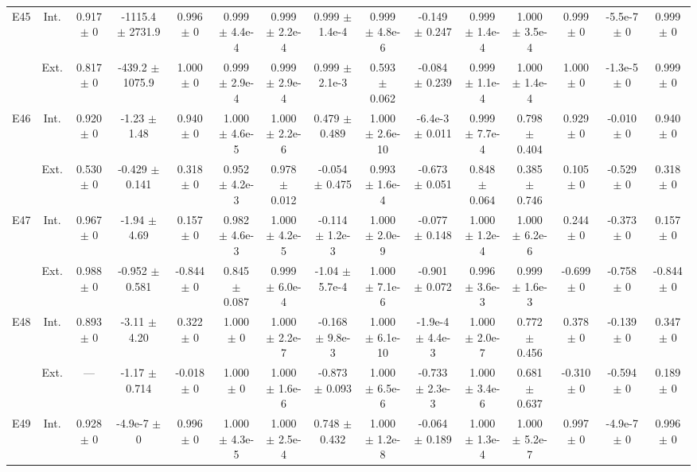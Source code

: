\begin{table}[htbp]
{\begin{tabular}{@{}ccccccccccccccc@{}}
\cline{2-15}
\multirow{2}{*}{E45} & Int. & 0.917 $\pm$ 0 & -1115.4 $\pm$ 2731.9 & 0.996 $\pm$ 0 & 0.999 $\pm$ 4.4e-4 & 0.999 $\pm$ 2.2e-4 & 0.999 $\pm$ 1.4e-4 & 0.999 $\pm$ 4.8e-6 & -0.149 $\pm$ 0.247 & 0.999 $\pm$ 1.4e-4 & 1.000 $\pm$ 3.5e-4 & 0.999 $\pm$ 0 & -5.5e-7 $\pm$ 0 & 0.999 $\pm$ 0 \\
 & Ext. & 0.817 $\pm$ 0 & -439.2 $\pm$ 1075.9 & 1.000 $\pm$ 0 & 0.999 $\pm$ 2.9e-4 & 0.999 $\pm$ 2.9e-4 & 0.999 $\pm$ 2.1e-3 & 0.593 $\pm$ 0.062 & -0.084 $\pm$ 0.239 & 0.999 $\pm$ 1.1e-4 & 1.000 $\pm$ 1.4e-4 & 1.000 $\pm$ 0 & -1.3e-5 $\pm$ 0 & 0.999 $\pm$ 0 \\
\cline{2-15}
\multirow{2}{*}{E46} & Int. & 0.920 $\pm$ 0 & -1.23 $\pm$ 1.48 & 0.940 $\pm$ 0 & 1.000 $\pm$ 4.6e-5 & 1.000 $\pm$ 2.2e-6 & 0.479 $\pm$ 0.489 & 1.000 $\pm$ 2.6e-10 & -6.4e-3 $\pm$ 0.011 & 0.999 $\pm$ 7.7e-4 & 0.798 $\pm$ 0.404 & 0.929 $\pm$ 0 & -0.010 $\pm$ 0 & 0.940 $\pm$ 0 \\
 & Ext. & 0.530 $\pm$ 0 & -0.429 $\pm$ 0.141 & 0.318 $\pm$ 0 & 0.952 $\pm$ 4.2e-3 & 0.978 $\pm$ 0.012 & -0.054 $\pm$ 0.475 & 0.993 $\pm$ 1.6e-4 & -0.673 $\pm$ 0.051 & 0.848 $\pm$ 0.064 & 0.385 $\pm$ 0.746 & 0.105 $\pm$ 0 & -0.529 $\pm$ 0 & 0.318 $\pm$ 0 \\
\cline{2-15}
\multirow{2}{*}{E47} & Int. & 0.967 $\pm$ 0 & -1.94 $\pm$ 4.69 & 0.157 $\pm$ 0 & 0.982 $\pm$ 4.6e-3 & 1.000 $\pm$ 4.2e-5 & -0.114 $\pm$ 1.2e-3 & 1.000 $\pm$ 2.0e-9 & -0.077 $\pm$ 0.148 & 1.000 $\pm$ 1.2e-4 & 1.000 $\pm$ 6.2e-6 & 0.244 $\pm$ 0 & -0.373 $\pm$ 0 & 0.157 $\pm$ 0 \\
 & Ext. & 0.988 $\pm$ 0 & -0.952 $\pm$ 0.581 & -0.844 $\pm$ 0 & 0.845 $\pm$ 0.087 & 0.999 $\pm$ 6.0e-4 & -1.04 $\pm$ 5.7e-4 & 1.000 $\pm$ 7.1e-6 & -0.901 $\pm$ 0.072 & 0.996 $\pm$ 3.6e-3 & 0.999 $\pm$ 1.6e-3 & -0.699 $\pm$ 0 & -0.758 $\pm$ 0 & -0.844 $\pm$ 0 \\
\cline{2-15}
\multirow{2}{*}{E48} & Int. & 0.893 $\pm$ 0 & -3.11 $\pm$ 4.20 & 0.322 $\pm$ 0 & 1.000 $\pm$ 0 & 1.000 $\pm$ 2.2e-7 & -0.168 $\pm$ 9.8e-3 & 1.000 $\pm$ 6.1e-10 & -1.9e-4 $\pm$ 4.4e-3 & 1.000 $\pm$ 2.0e-7 & 0.772 $\pm$ 0.456 & 0.378 $\pm$ 0 & -0.139 $\pm$ 0 & 0.347 $\pm$ 0 \\
 & Ext. & --- & -1.17 $\pm$ 0.714 & -0.018 $\pm$ 0 & 1.000 $\pm$ 0 & 1.000 $\pm$ 1.6e-6 & -0.873 $\pm$ 0.093 & 1.000 $\pm$ 6.5e-6 & -0.733 $\pm$ 2.3e-3 & 1.000 $\pm$ 3.4e-6 & 0.681 $\pm$ 0.637 & -0.310 $\pm$ 0 & -0.594 $\pm$ 0 & 0.189 $\pm$ 0 \\
\cline{2-15}
\multirow{2}{*}{E49} & Int. & 0.928 $\pm$ 0 & -4.9e-7 $\pm$ 0 & 0.996 $\pm$ 0 & 1.000 $\pm$ 4.3e-5 & 1.000 $\pm$ 2.5e-4 & 0.748 $\pm$ 0.432 & 1.000 $\pm$ 1.2e-8 & -0.064 $\pm$ 0.189 & 1.000 $\pm$ 1.3e-4 & 1.000 $\pm$ 5.2e-7 & 0.997 $\pm$ 0 & -4.9e-7 $\pm$ 0 & 0.996 $\pm$ 0 \\

\end{tabular}}
\end{table}
